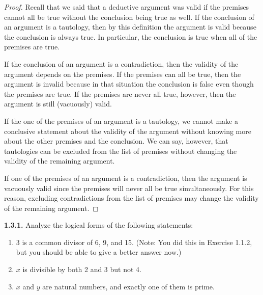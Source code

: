 \documentclass[12pt]{amsart}
\newenvironment{statement}[1]{\smallskip\noindent\color[rgb]{.6627, .3529, .6314} {\bf #1.}}{}
\theoremstyle{definition}
\theoremstyle{remark}
\begin{document}
\begin{proof}
Recall that we said that a deductive argument was valid if the premises cannot all be true without the conclusion being true as well.
If the conclusion of an argument is a tautology, then by this definition the argument is valid because the conclusion is always true.
In particular, the conclusion is true when all of the premises are true.

If the conclusion of an argument is a contradiction, then the validity of the argument depends on the premises.
If the premises can all be true, then the argument is invalid because in that situation the conclusion is false even though the premises are true.
If the premises are never all true, however, then the argument is still (vacuously) valid.

If the one of the premises of an argument is a tautology, we cannot make a conclusive statement about the validity of the argument without knowing more about the other premises and the conclusion.
We can say, however, that tautologies can be excluded from the list of premises without changing the validity of the remaining argument.

If one of the premises of an argument is a contradiction, then the argument is vacuously valid since the premises will never all be true simultaneously.
For this reason, excluding contradictions from the list of premises may change the validity of the remaining argument.
\end{proof}


\begin{statement}{1.3.1}
Analyze the logical forms of the following statements:
\begin{enumerate}
	\item 3 is a common divisor of 6, 9, and 15.
	(Note: You did this in Exercise 1.1.2, but you should be able to give a better answer now.)
	
	\item $x$ is divisible by both 2 and 3 but not 4.
	
	\item $x$ and $y$ are natural numbers, and exactly one of them is prime.
\end{enumerate}
\end{statement}
\end{document}
